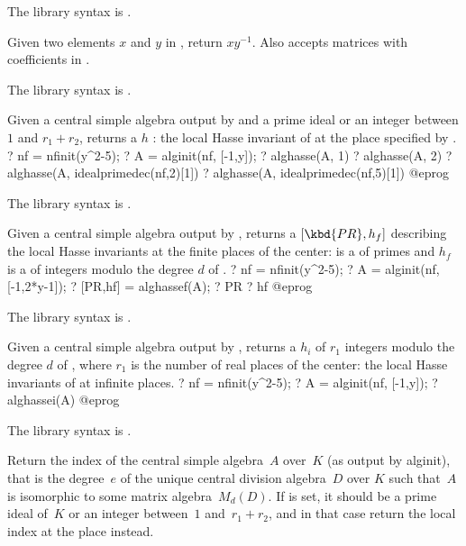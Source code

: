 The library syntax is .

\label{se:algdivr}
Given two elements $x$ and $y$ in , return $xy^{-1}$. Also accepts
matrices with coefficients in .

The library syntax is .

\label{se:alghasse}
Given a central simple algebra  output by  and a prime
ideal or an integer between $1$ and $r_1+r_2$, returns a  $h$ : the
local Hasse invariant of  at the place specified by .
\bprog
? nf = nfinit(y^2-5);
? A = alginit(nf, [-1,y]);
? alghasse(A, 1)
? alghasse(A, 2)
? alghasse(A, idealprimedec(nf,2)[1])
? alghasse(A, idealprimedec(nf,5)[1])
@eprog

The library syntax is .

\label{se:alghassef}
Given a central simple algebra  output by , returns
a  $[\kbd{PR}, h_f]$ describing the local Hasse invariants at the
finite places of the center:  is a  of primes and $h_f$ is a
 of integers modulo the degree $d$ of .
\bprog
? nf = nfinit(y^2-5);
? A = alginit(nf, [-1,2*y-1]);
? [PR,hf] = alghassef(A);
? PR
? hf
@eprog

The library syntax is .

\label{se:alghassei}
Given a central simple algebra  output by , returns
a  $h_i$ of $r_1$ integers modulo the degree $d$ of ,
where $r_1$ is the number of real places of the center: the local Hasse
invariants of  at infinite places.
\bprog
? nf = nfinit(y^2-5);
? A = alginit(nf, [-1,y]);
? alghassei(A)
@eprog

The library syntax is .

\label{se:algindex}
Return the index of the central simple algebra~$A$ over~$K$ (as output by
alginit), that is the degree~$e$ of the unique central division algebra~$D$
over $K$ such that~$A$ is isomorphic to some matrix algebra~$M_d(D)$. If
 is set, it should be a prime ideal of~$K$ or an integer between~$1$
and~$r_1+r_2$, and in that case return the local index at the place 
instead.

